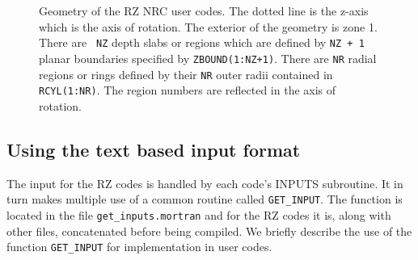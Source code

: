 \documentclass[12pt,twoside]{article}  %
\begin{document}
\begin{figure}[htb]
\begin{center}
\begin{verbatim}
\end{verbatim}
\caption[Schematic of the RZ geometry and notation.]{Geometry of the
RZ NRC user codes.  The dotted line is the z-axis which is the axis
of rotation.  The exterior of the geometry is zone 1.  There are {\tt
NZ} depth slabs or regions which are defined by {\tt NZ + 1} planar boundaries
specified by  {\tt ZBOUND(1:NZ+1)}. There are {\tt NR} radial regions or
rings
defined by their {\tt NR} outer radii contained in {\tt RCYL(1:NR)}. The region
numbers are reflected in the axis of rotation.
\label{fig_geom}
\vspace{3mm} }
\end{center}
\end{figure}


\newpage
\subsection{Using the text based input format}
\label{UNIF}

The input for the RZ codes is handled by each code's
INPUTS subroutine. It in turn makes multiple use of a common routine called
\verb+GET_INPUT+.
The function is located in the file \verb+get_inputs.mortran+
and for the RZ codes it is, along with other files, concatenated before
being compiled.
We briefly describe the use of the function \verb+GET_INPUT+
for implementation in user codes.
\end{document}
